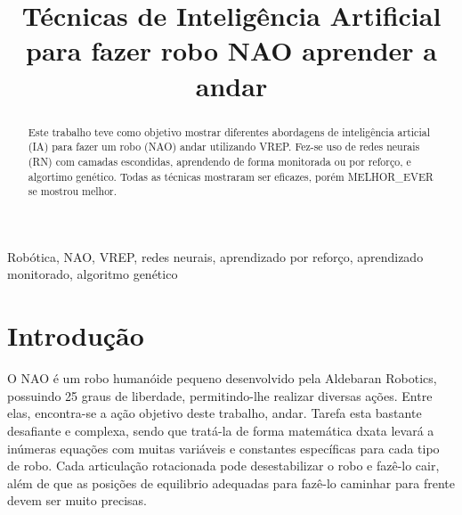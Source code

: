 \documentclass[twoside,conference,a4paper]{IEEEtran}
\begin{document}
\renewcommand{\IEEEkeywordsname}{Palavras-chave}


\title{Técnicas de Inteligência Artificial para fazer robo NAO aprender a andar}
\author{%
}


\maketitle

\begin{abstract}
Este trabalho teve como objetivo mostrar diferentes abordagens de inteligência articial (IA) para fazer um robo (NAO) andar utilizando VREP. Fez-se uso de redes neurais (RN) com camadas escondidas, aprendendo de forma monitorada ou por reforço, e algortimo genético. Todas as técnicas mostraram ser eficazes, porém MELHOR\_EVER se mostrou melhor.
\end{abstract}

\begin{IEEEkeywords}
 Robótica, NAO, VREP, redes neurais, aprendizado por reforço, aprendizado monitorado, algoritmo genético
\end{IEEEkeywords}


\section{Introdução}

O NAO é um robo humanóide pequeno desenvolvido pela Aldebaran Robotics, possuindo 25 graus de liberdade, permitindo-lhe realizar diversas ações. Entre elas, encontra-se a ação objetivo deste trabalho, andar. Tarefa esta bastante desafiante e complexa, sendo que tratá-la de forma matemática dxata levará a inúmeras equações com muitas variáveis e constantes específicas para cada tipo de robo. Cada articulação rotacionada pode desestabilizar o robo e fazê-lo cair, além de que as posições de equilibrio adequadas para fazê-lo caminhar para frente devem ser muito precisas.
\end{document}
